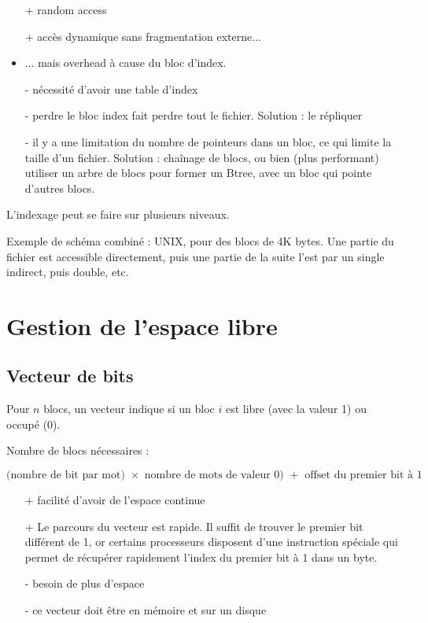 	
	\begin{itemize}
		\item[+] random access
		\item[+] accès dynamique sans fragmentation externe...
		\item ... mais overhead à cause du bloc d'index.
		\item[-] nécessité d'avoir une table d'index
		\item[-] perdre le bloc index fait perdre tout le fichier. Solution : le répliquer
		\item[-] il y a une limitation du nombre de pointeurs dans un bloc, ce qui limite la taille d'un fichier. Solution : chaînage de blocs, ou bien (plus performant) utiliser un arbre de blocs pour former un Btree, avec un bloc qui pointe d'autres blocs.
	\end{itemize}
	
	L'indexage peut se faire sur plusieurs niveaux.
	
	
	Exemple de schéma combiné : UNIX, pour des blocs de 4K bytes. Une partie du fichier est accessible directement, puis une partie de la suite l'est par un single indirect, puis double, etc.
	
	
\section{Gestion de l'espace libre}

	\subsection{Vecteur de bits}
	
	Pour $n$ blocs, un vecteur indique si un bloc $i$ est libre (avec la valeur 1) ou occupé (0). 
	
	Nombre de blocs nécessaires :
	
	$$\text{(nombre de bit par mot) } \times \text{ nombre de mots de valeur 0) } + \text{ offset du premier bit à 1}$$
	
	\begin{itemize}
		\item[+] facilité d'avoir de l'espace continue
		\item[+] Le parcours du vecteur est rapide. Il suffit de trouver le premier bit différent de 1, or certains processeurs disposent d'une instruction spéciale qui permet de récupérer rapidement l'index du premier bit à 1 dans un byte.
		\item[-] besoin de plus d'espace
		\item[-] ce vecteur doit être en mémoire et sur un disque
	\end{itemize}
	
